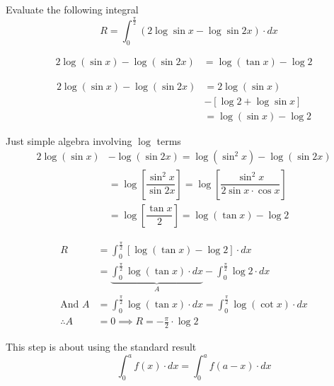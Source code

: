 \documentclass[14pt,fleqn]{extarticle}
\begin{document}
Evaluate the following integral 
\[ \quad R = \int_0^{\frac\pi{2}} \left(2\log\sin x - \log\sin 2x \right)\cdot dx \] 

\newcard 
\begin{align}
	2\log \left( \sin x \right) - \log \left(\sin 2x \right) &= \log \left(\tan x \right) - \log 2 
\end{align}

\newcard 

\begin{align}
	2\log \left( \sin x \right) - \log \left(\sin 2x \right) &= 
	2\log \left(\sin x \right) \\
	&-\left[\log 2 + \log \sin x \right] \\ 
	&= \log \left(\sin x \right) -\log 2 
\end{align}

\newcard 

Just simple algebra involving $\log$ terms
\begin{align}
	2\log \left( \sin x \right) &- \log \left(\sin 2x \right) =\log \left(\sin^2 x \right)-\log \left(\sin 2x \right) \\
	&= \log \left[\dfrac{\sin^2 x}{\sin 2x} \right] = \log \left[\dfrac{\sin^2 x}{2\sin x \cdot\cos x}\right] \\
	&= \log \left[\dfrac{\tan x}{2} \right] = \log \left(\tan x \right)-\log 2
\end{align}

\newcard 

\begin{align}
R &= \int_0^{\frac\pi{2}} \left[\log \left(\tan x \right) - \log 2 \right]\cdot dx \\
&= \underbrace{\int_0^{\frac\pi{2}}\log \left(\tan x \right)\cdot dx}_{A} - \int_0^{\frac\pi{2}}\log 2\cdot dx \\
\text{And } A &= \int_0^{\frac\pi{2}}\log \left(\tan x \right)\cdot dx 
=\int_0^{\frac\pi{2}}\log \left(\cot x \right)\cdot dx \\
\therefore A &= 0 \implies R = -\frac\pi{2}\cdot\log 2
\end{align}

\newcard 

This step is about using the standard result 
\[\qquad \int_0^a f(x)\cdot dx = \int_0^a f \left(a-x \right)\cdot dx  \]
\end{document}
